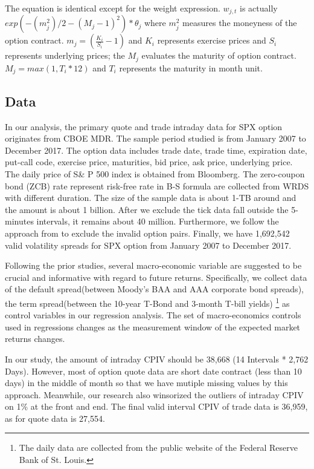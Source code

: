 \begin{enumerate}
The equation is identical except for the weight expression. $w_{j,t}$ is actually $exp(-(m_{j}^{2})/2 -(M_{j} - 1)^{2}) * \theta_{j}$ where $m_{j}^{2}$ measures the moneyness of the option contract.  $m_{j} =  (\frac{K_{i}}{S_{i}} - 1)$ and $K_{i}$ represents exercise prices and $S_{i}$ represents underlying prices; the $M_{j}$ evaluates the maturity of option contract. $M_{j} =  max(1, T_{i}*12) $ and $T_{i}$ represents the maturity in month unit. 


\end{enumerate}


\subsection{Data}
In our analysis, the primary quote and trade intraday data for SPX option originates from CBOE MDR. The sample period studied is from January 2007 to December 2017. The option data includes trade date, trade time, expiration date, put-call code, exercise price, maturities, bid price, ask price, underlying price. The daily price of S\& P 500 index is obtained from Bloomberg. The zero-coupon bond (ZCB) rate represent risk-free rate in B-S formula are collected from WRDS with different duration. The size of the sample data is about 1-TB around and the amount is about 1 billion. After we exclude the tick data fall outside the 5-minutes intervals, it remains about 40 million. Furthermore, we follow the approach from \textcite{ofek2004limited} to exclude the invalid option pairs. Finally, we have 1,692,542 valid volatility spreads for SPX option from January 2007 to December 2017. 


Following the prior studies\textcite{bollerslev2009expected}, several macro-economic variable are suggested to be crucial and informative with regard to future returns. Specifically, we collect data of the default spread(between Moody's BAA and AAA corporate bond spreads), the term spread(between the 10-year T-Bond and 3-month T-bill yields) \footnote{The daily data are collected from the public website of the Federal Reserve Bank of St. Louis.} as control variables in our regression analysis. The set of macro-economics controls used in regressions changes as the measurement window of the expected market returns changes. 


In our study, the amount of intraday CPIV should be 38,668 (14 Intervals * 2,762 Days). However, most of option quote data are short date contract (less than 10 days) in the middle of month so that we have mutiple missing values by this approach. Meanwhile, our research also winsorized the outliers of intraday CPIV on 1\% at the front and end. The final valid interval CPIV of trade data is 36,959, as for quote data is 27,554.


